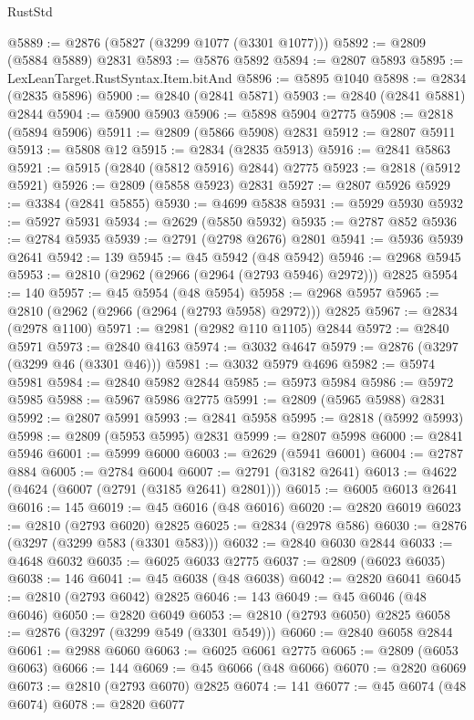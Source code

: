\begin{lexlean}{RustStd}
\begin{coremodule}
@5889 := @2876 (@5827 (@3299 @1077 (@3301 @1077)))
@5892 := @2809 (@5884 @5889) @2831
@5893 := @5876 @5892
@5894 := @2807 @5893
@5895 := LexLeanTarget.RustSyntax.Item.bitAnd
@5896 := @5895 @1040
@5898 := @2834 (@2835 @5896)
@5900 := @2840 (@2841 @5871)
@5903 := @2840 (@2841 @5881) @2844
@5904 := @5900 @5903
@5906 := @5898 @5904 @2775
@5908 := @2818 (@5894 @5906)
@5911 := @2809 (@5866 @5908) @2831
@5912 := @2807 @5911
@5913 := @5808 @12
@5915 := @2834 (@2835 @5913)
@5916 := @2841 @5863
@5921 := @5915 (@2840 (@5812 @5916) @2844) @2775
@5923 := @2818 (@5912 @5921)
@5926 := @2809 (@5858 @5923) @2831
@5927 := @2807 @5926
@5929 := @3384 (@2841 @5855)
@5930 := @4699 @5838
@5931 := @5929 @5930
@5932 := @5927 @5931
@5934 := @2629 (@5850 @5932)
@5935 := @2787 @852
@5936 := @2784 @5935
@5939 := @2791 (@2798 @2676) @2801
@5941 := @5936 @5939 @2641
@5942 := 139
@5945 := @45 @5942 (@48 @5942)
@5946 := @2968 @5945
@5953 := @2810 (@2962 (@2966 (@2964 (@2793 @5946) @2972))) @2825
@5954 := 140
@5957 := @45 @5954 (@48 @5954)
@5958 := @2968 @5957
@5965 := @2810 (@2962 (@2966 (@2964 (@2793 @5958) @2972))) @2825
@5967 := @2834 (@2978 @1100)
@5971 := @2981 (@2982 @110 @1105) @2844
@5972 := @2840 @5971
@5973 := @2840 @4163
@5974 := @3032 @4647
@5979 := @2876 (@3297 (@3299 @46 (@3301 @46)))
@5981 := @3032 @5979 @4696
@5982 := @5974 @5981
@5984 := @2840 @5982 @2844
@5985 := @5973 @5984
@5986 := @5972 @5985
@5988 := @5967 @5986 @2775
@5991 := @2809 (@5965 @5988) @2831
@5992 := @2807 @5991
@5993 := @2841 @5958
@5995 := @2818 (@5992 @5993)
@5998 := @2809 (@5953 @5995) @2831
@5999 := @2807 @5998
@6000 := @2841 @5946
@6001 := @5999 @6000
@6003 := @2629 (@5941 @6001)
@6004 := @2787 @884
@6005 := @2784 @6004
@6007 := @2791 (@3182 @2641)
@6013 := @4622 (@4624 (@6007 (@2791 (@3185 @2641) @2801)))
@6015 := @6005 @6013 @2641
@6016 := 145
@6019 := @45 @6016 (@48 @6016)
@6020 := @2820 @6019
@6023 := @2810 (@2793 @6020) @2825
@6025 := @2834 (@2978 @586)
@6030 := @2876 (@3297 (@3299 @583 (@3301 @583)))
@6032 := @2840 @6030 @2844
@6033 := @4648 @6032
@6035 := @6025 @6033 @2775
@6037 := @2809 (@6023 @6035)
@6038 := 146
@6041 := @45 @6038 (@48 @6038)
@6042 := @2820 @6041
@6045 := @2810 (@2793 @6042) @2825
@6046 := 143
@6049 := @45 @6046 (@48 @6046)
@6050 := @2820 @6049
@6053 := @2810 (@2793 @6050) @2825
@6058 := @2876 (@3297 (@3299 @549 (@3301 @549)))
@6060 := @2840 @6058 @2844
@6061 := @2988 @6060
@6063 := @6025 @6061 @2775
@6065 := @2809 (@6053 @6063)
@6066 := 144
@6069 := @45 @6066 (@48 @6066)
@6070 := @2820 @6069
@6073 := @2810 (@2793 @6070) @2825
@6074 := 141
@6077 := @45 @6074 (@48 @6074)
@6078 := @2820 @6077

\end{coremodule}
\end{lexlean}
